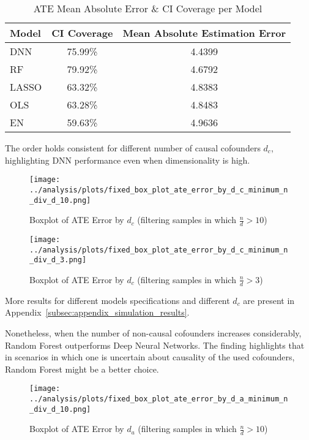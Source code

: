 \documentclass{article}
\numberwithin{equation}{section}
\begin{document}
\begin{table}[H]
    \centering
    \begin{tabular}{lcc}
        \toprule
        Model & CI Coverage & Mean Absolute Estimation Error \\
        \midrule
        DNN     & 75.99\% & 4.4399 \\
        RF      & 79.92\% & 4.6792 \\
        LASSO   & 63.32\% & 4.8383 \\
        OLS     & 63.28\% & 4.8483 \\
        EN      & 59.63\% & 4.9636 \\
        \bottomrule
    \end{tabular}
    \caption{ATE Mean Absolute Error \& CI Coverage per Model}
\end{table}

The order holds consistent for different number of causal cofounders $d_c$, highlighting DNN performance even when dimensionality is high.

\begin{figure}[H]
    \centering
    \texttt{[image: ../analysis/plots/fixed\_box\_plot\_ate\_error\_by\_d\_c\_minimum\_n\_div\_d\_10.png]}
    \caption{Boxplot of ATE Error by $d_c$ (filtering samples in which $\frac{n}{d} > 10$)}
\end{figure}

\begin{figure}[H]
    \centering
    \texttt{[image: ../analysis/plots/fixed\_box\_plot\_ate\_error\_by\_d\_c\_minimum\_n\_div\_d\_3.png]}
    \caption{Boxplot of ATE Error by $d_c$ (filtering samples in which $\frac{n}{d} > 3$)}
\end{figure}

More results for different models specifications and different $d_c$ are present in Appendix~\ref{subsec:appendix_simulation_results}.

Nonetheless, when the number of non-causal cofounders increases considerably, Random Forest outperforms Deep Neural Networks. The finding highlights that in scenarios in which one is uncertain about causality of the used cofounders, Random Forest might be a better choice.

\begin{figure}[H]
    \centering
    \texttt{[image: ../analysis/plots/fixed\_box\_plot\_ate\_error\_by\_d\_a\_minimum\_n\_div\_d\_10.png]}
    \caption{Boxplot of ATE Error by $d_a$ (filtering samples in which $\frac{n}{d} > 10$)}
\end{figure}
\end{document}
